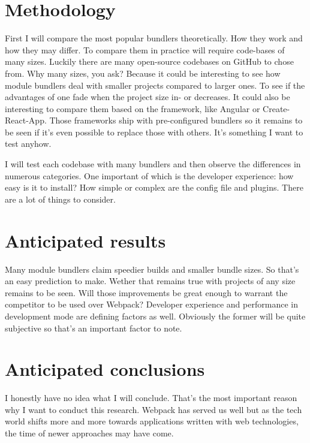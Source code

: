 \section{Methodology}
\label{sec:methodologie}

First I will compare the most popular bundlers theoretically. How they work and how they may differ. 
To compare them in practice will require code-bases of many sizes. Luckily there are many open-source codebases on GitHub to chose from. Why many sizes, you ask? Because it could be interesting to see how module bundlers deal with smaller projects compared to larger ones. To see if the advantages of one fade when the project size in- or decreases. It could also be interesting to compare them based on the framework, like Angular or Create-React-App. Those frameworks ship with pre-configured bundlers so it remains to be seen if it's even possible to replace those with others. It's something I want to test anyhow. 

I will test each codebase with many bundlers and then observe the differences in numerous categories. One important of which is the developer experience: how easy is it to install? How simple or complex are the config file and plugins. There are a lot of things to consider. 

\section{Anticipated results}
\label{sec:verwachte_resultaten}

Many module bundlers claim speedier builds and smaller bundle sizes. So that's an easy prediction to make. Wether that remains true with projects of any size remains to be seen. Will those improvements be great enough to warrant the competitor to be used over Webpack? Developer experience and performance in development mode are defining factors as well. Obviously the former will be quite subjective so that's an important factor to note.

\section{Anticipated conclusions}
\label{sec:verwachte_conclusies}

I honestly have no idea what I will conclude. That's the most important reason why I want to conduct this research. Webpack has served us well but as the tech world shifts more and more towards applications written with web technologies, the time of newer approaches may have come.


